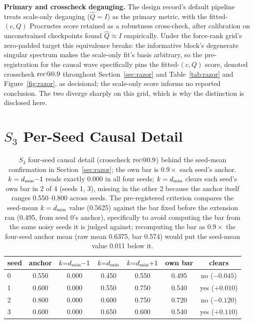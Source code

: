 \textbf{Primary and crosscheck degauging.} The design record's default
pipeline treats scale-only degauging ($\hat{Q} = I$) as the primary
metric, with the fitted-$(c, Q)$ Procrustes score retained as a
robustness cross-check, after calibration on unconstrained checkpoints
found $\hat{Q} \approx I$ empirically. Under the force-rank grid's
zero-padded target this equivalence breaks: the informative block's
degenerate singular spectrum makes the scale-only fit's basis
arbitrary, so the pre-registration for the causal wave specifically
pins the fitted-$(c, Q)$ score, denoted crosscheck $\mathrm{rec}@0.9$
throughout Section~\ref{sec:razor} and Table~\ref{tab:razor} and Figure~\ref{fig:razor}, as decisional; the scale-only score informs no
reported conclusion. The two diverge sharply on this grid, which is why
the distinction is disclosed here.

\section{$S_3$ Per-Seed Causal Detail}
\label{app:s3causal}

\begin{table}[H]
\centering
\small
\begin{tabular}{lcccccc}
\toprule
seed & anchor & $k{=}d_{\min}{-}1$ & $k{=}d_{\min}$ & $k{=}d_{\min}{+}1$ & own bar & clears \\
\midrule
0 & 0.550 & 0.000 & 0.450 & 0.550 & 0.495 & no ($-0.045$) \\
1 & 0.600 & 0.000 & 0.550 & 0.750 & 0.540 & yes ($+0.010$) \\
2 & 0.800 & 0.000 & 0.600 & 0.750 & 0.720 & no ($-0.120$) \\
3 & 0.600 & 0.000 & 0.650 & 0.600 & 0.540 & yes ($+0.110$) \\
\bottomrule
\end{tabular}
\caption{$S_3$ four-seed causal detail (crosscheck $\mathrm{rec}@0.9$) behind
the seed-mean confirmation in Section~\ref{sec:razor}; the own bar is
$0.9 \times$ each seed's anchor. $k = d_{\min}{-}1$ reads exactly 0.000 in
all four seeds; $k = d_{\min}$ clears each seed's own bar in 2 of 4 (seeds
1, 3), missing in the other 2 because the anchor itself ranges
0.550--0.800 across seeds. The pre-registered criterion compares the
seed-mean $k = d_{\min}$ value (0.5625) against the bar fixed before the
extension ran (0.495, from seed 0's anchor), specifically to avoid
computing the bar from the same noisy seeds it is judged against;
recomputing the bar as $0.9\times$ the four-seed anchor mean (raw mean
0.6375, bar 0.574) would put the seed-mean value 0.011 below it.}
\label{tab:s3seeds}
\end{table}

